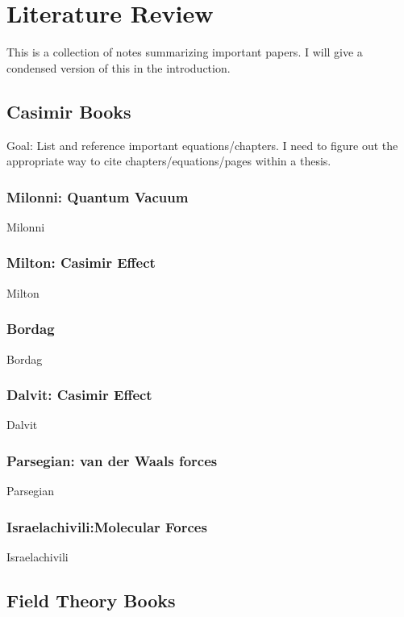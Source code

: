 \chapter{Literature Review}

This is a collection of notes summarizing important papers.  I will give a condensed version of this in the introduction.  

\section{Casimir Books}

Goal: List and reference important equations/chapters.  
I need to figure out the appropriate way to cite chapters/equations/pages within a thesis.  

\subsection{Milonni: Quantum Vacuum}

Milonni~\cite{Milonnibook1994}

\subsection{Milton: Casimir Effect}
Milton~\cite{Miltonbook2001}

\subsection{Bordag}
Bordag~\cite{Bordagbook2009}

\subsection{Dalvit: Casimir Effect}
Dalvit~\cite{Dalvitbook2011}

\subsection{Parsegian: van der Waals forces}

Parsegian~\cite{Parsegian2006}



\subsection{Israelachivili:Molecular Forces}

Israelachivili~\cite{Israelachvili2011}


\section{Field Theory Books}

